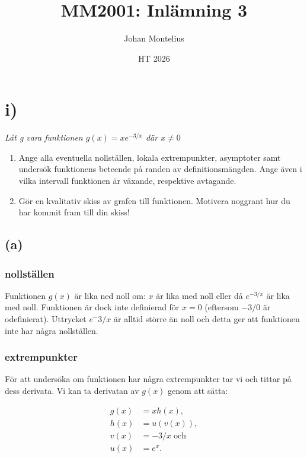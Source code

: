 \documentclass[a4paper, 11pt]{article}
\begin{document}
\title{
    \textbf{MM2001: Inlämning 3}
}
\author{Johan Montelius}
\date{HT 2026}

\maketitle

\section*{i)}
{\em
Låt g vara funktionen $g(x) = x e^{-3/x}$ där $x \neq 0$

\begin{enumerate}[label=(\alph*)]
    
  \item Ange alla eventuella nollställen, lokala extrempunkter,
    asymptoter samt undersök funktionens beteende på randen av
    definitionsmängden.  Ange även i vilka intervall funktionen är
    växande, respektive avtagande.

  \item Gör en kvalitativ skiss av grafen till funktionen. Motivera
    noggrant hur du har kommit fram till din skiss!
\end{enumerate}
}

\subsection*{(a)}

\subsubsection*{nollställen}

Funktionen $g(x)$ är lika ned noll om: $x$ är lika med noll eller då
$e^{-3/x}$ är lika med noll. Funktionen är dock inte definierad för
$x = 0$ (eftersom $-3/0$ är odefinierat). Uttrycket $e^-3/x$ är alltid
större än noll och detta ger att funktionen inte har några
nollställen.

\subsubsection*{extrempunkter}

För att undersöka om funktionen har några extrempunkter tar vi och
tittar på dess derivata.  Vi kan ta derivatan av $g(x)$ genom att
sätta:

\begin{align*}
  g(x) &= x h(x), \\
  h(x) & = u(v(x)), \\
  v(x) &= -3/x \;\text{och}\\
  u(x) &= e^x.\\
\end{align*}
\end{document}
